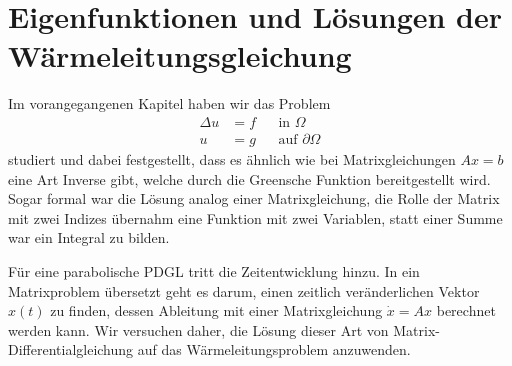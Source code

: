 %
%
%
\section{Eigenfunktionen und Lösungen der Wärmeleitungsgleichung}
Im vorangegangenen Kapitel haben wir das Problem
\begin{align*}
\Delta u&=f&&\text{in $\Omega$}\\
u&=g&&\text{auf $\partial\Omega$}
\end{align*}
studiert und dabei festgestellt, dass es ähnlich wie bei Matrixgleichungen
$Ax=b$ eine Art Inverse gibt, welche durch die Greensche Funktion
bereitgestellt wird. Sogar formal war die Lösung analog einer Matrixgleichung,
die Rolle der Matrix mit zwei Indizes übernahm eine Funktion mit zwei
Variablen, statt einer Summe war ein Integral zu bilden.

Für eine parabolische PDGL tritt die Zeitentwicklung hinzu. In
ein Matrixproblem übersetzt geht es darum, einen zeitlich
veränderlichen Vektor $x(t)$ zu finden, dessen Ableitung mit einer
Matrixgleichung $\dot x=Ax$ berechnet werden kann. Wir versuchen daher,
die Lösung dieser Art von Matrix-Differentialgleichung auf das
Wärmeleitungsproblem anzuwenden.

